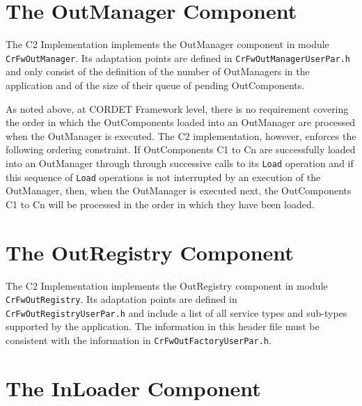 \documentclass{pnp_article}
\begin{document}
\section{The OutManager Component}\label{sec:OutManager}


The C2 Implementation implements the OutManager component in module \texttt{CrFwOutManager}. Its adaptation points are defined in \texttt{CrFwOutManagerUserPar.h} and only consist of the definition of the number of OutManagers in the application and of the size of their queue of pending OutComponents. 

As noted above, at CORDET Framework level, there is no requirement covering the order in which the OutComponents loaded into an OutManager are processed when the OutManager is executed. The C2 implementation, however, enforces the following ordering constraint. If OutComponents C1 to Cn are successfully loaded into an OutManager through through successive calls to its \texttt{Load} operation and if this sequence of \texttt{Load} operations is not interrupted by an execution of the OutManager, then, when the OutManager is executed next, the OutComponents C1 to Cn will be processed in the order in which they have been loaded.

\section{The OutRegistry Component}\label{sec:OutRegistry}


The C2 Implementation implements the OutRegistry component in module \texttt{CrFwOutRegistry}. Its adaptation points are defined in \texttt{CrFwOutRegistryUserPar.h} and include a list of all service types and sub-types supported by the application. The information in this header file must be consistent with the information in \texttt{CrFwOutFactoryUserPar.h}.

\clearpage
\section{The InLoader Component}\label{sec:InLoader}

\end{document}
